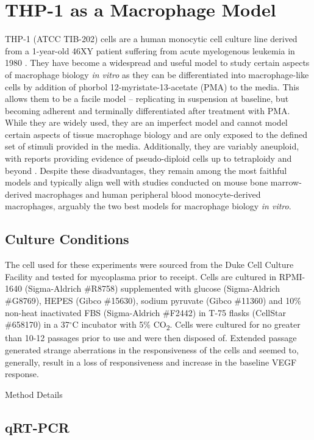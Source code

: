 \section{THP-1 as a Macrophage Model}

THP-1 (ATCC TIB-202) cells are a human monocytic cell culture line derived from a 1-year-old 46XY patient suffering from acute myelogenous leukemia in 1980 \citep{Tsuchiya1980}. They have become a widespread and useful model to study certain aspects of macrophage biology \textit{in vitro} as they can be differentiated into macrophage-like cells by addition of phorbol 12-myristate-13-acetate (PMA) to the media. This allows them to be a facile model -- replicating in suspension at baseline, but becoming adherent and terminally differentiated after treatment with PMA. While they are widely used, they are an imperfect model and cannot model certain aspects of tissue macrophage biology and are only exposed to the defined set of stimuli provided in the media. Additionally, they are variably aneuploid, with reports providing evidence of pseudo-diploid cells up to tetraploidy and beyond \citep{}. Despite these disadvantages, they remain among the most faithful models and typically align well with studies conducted on mouse bone marrow-derived macrophages and human peripheral blood monocyte-derived macrophages, arguably the two best models for macrophage biology \textit{in vitro}. 

\subsection{Culture Conditions}

The cell used for these experiments were sourced from the Duke Cell Culture Facility and tested for mycoplasma prior to receipt. Cells are cultured in RPMI-1640 (Sigma-Aldrich \#R8758) supplemented with glucose (Sigma-Aldrich \#G8769), HEPES (Gibco \#15630), sodium pyruvate (Gibco \#11360) and 10\% non-heat inactivated FBS (Sigma-Aldrich \#F2442) in T-75 flasks (CellStar \#658170) in a 37$^{\circ}$C incubator with 5\% CO\textsubscript{2}. Cells were cultured for no greater than 10-12 passages prior to use and were then disposed of. Extended passage generated strange aberrations in the responsiveness of the cells and seemed to, generally, result in a loss of responsiveness and increase in the baseline VEGF response. 

Method Details

\subsection{qRT-PCR}

